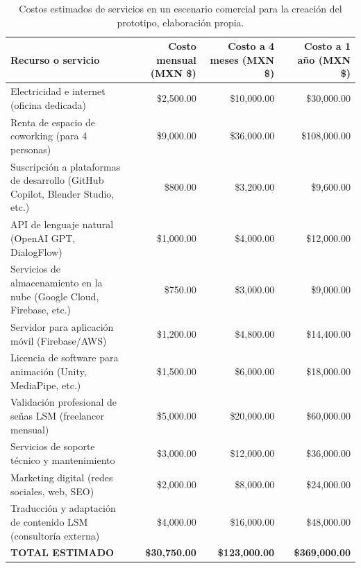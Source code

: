 \begin{table}[H]
	\centering
	\renewcommand{\arraystretch}{1.6}
	\setlength{\tabcolsep}{12pt}
	\Huge %
	\begin{adjustbox}{max width=\textwidth}
		\begin{tabular}{|p{7cm}|r|r|r|}
			\hline
			\textbf{Recurso o servicio} & \textbf{Costo mensual (MXN \$)} & \textbf{Costo a 4 meses (MXN \$)} & \textbf{Costo a 1 año (MXN \$)} \\ \hline
			Electricidad e internet (oficina dedicada) & \$2,500.00 & \$10,000.00 & \$30,000.00 \\ \hline
			Renta de espacio de coworking (para 4 personas) & \$9,000.00 & \$36,000.00 & \$108,000.00 \\ \hline
			Suscripción a plataformas de desarrollo (GitHub Copilot, Blender Studio, etc.) & \$800.00 & \$3,200.00 & \$9,600.00 \\ \hline
			API de lenguaje natural (OpenAI GPT, DialogFlow) & \$1,000.00 & \$4,000.00 & \$12,000.00 \\ \hline
			Servicios de almacenamiento en la nube (Google Cloud, Firebase, etc.) & \$750.00 & \$3,000.00 & \$9,000.00 \\ \hline
			Servidor para aplicación móvil (Firebase/AWS) & \$1,200.00 & \$4,800.00 & \$14,400.00 \\ \hline
			Licencia de software para animación (Unity, MediaPipe, etc.) & \$1,500.00 & \$6,000.00 & \$18,000.00 \\ \hline
			Validación profesional de señas LSM (freelancer mensual) & \$5,000.00 & \$20,000.00 & \$60,000.00 \\ \hline
			Servicios de soporte técnico y mantenimiento & \$3,000.00 & \$12,000.00 & \$36,000.00 \\ \hline
			Marketing digital (redes sociales, web, SEO) & \$2,000.00 & \$8,000.00 & \$24,000.00 \\ \hline
			Traducción y adaptación de contenido LSM (consultoría externa) & \$4,000.00 & \$16,000.00 & \$48,000.00 \\ \hline
			\textbf{TOTAL ESTIMADO} & \textbf{\$30,750.00} & \textbf{\$123,000.00} & \textbf{\$369,000.00} \\ \hline
		\end{tabular}
	\end{adjustbox}
	\caption[Costos estimados de servicios en un escenario comercial para la creación del prototipo]{Costos estimados de servicios en un escenario comercial para la creación del prototipo, elaboración propia.}
	\label{tab:costos_comercial}
\end{table}


